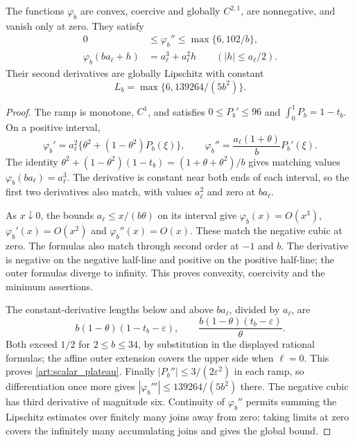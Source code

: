 \begin{lemma}\label{art:upper_scalar_lemma}
The functions $\varphi_b$ are convex, coercive and globally $C^{2,1}$,
are nonnegative, and vanish only at zero. They satisfy
\begin{align}
 0&\le\varphi_b''\le\max\{6,102/b\},\label{art:scalar_curvature}\\
 \varphi_b(ba_\ell+h)&=a_\ell^3+a_\ell^2h
       \qquad(|h|\le a_\ell/2).\label{art:scalar_plateau}
\end{align}
Their second derivatives are globally Lipschitz with constant
\[
 L_b=\max\{6,139264/(5b^2)\}.
\]
\end{lemma}
\begin{proof}
The ramp is monotone, $C^1$, and satisfies
$0\le P_b'\le96$ and $\int_0^1P_b=1-t_b$. On a positive interval,
\[
 \varphi_b'=a_\ell^2\{\theta^2+(1-\theta^2)P_b(\xi)\},\qquad
 \varphi_b''=\frac{a_\ell(1+\theta)}bP_b'(\xi).
\]
The identity
$\theta^2+(1-\theta^2)(1-t_b)=(1+\theta+\theta^2)/b$
gives matching values $\varphi_b(ba_\ell)=a_\ell^3$. The derivative is
constant near both ends of each interval, so the first two derivatives
also match, with values $a_\ell^2$ and zero at $ba_\ell$.

As $x\downarrow0$, the bounds $a_\ell\le x/(b\theta)$ on its interval
give $\varphi_b(x)=O(x^3)$, $\varphi_b'(x)=O(x^2)$ and
$\varphi_b''(x)=O(x)$. These match the negative cubic at zero.
The formulas also match through second order at $-1$ and $b$.
The derivative is negative on the negative half-line and positive on the
positive half-line; the outer formulas diverge to infinity. This proves
convexity, coercivity and the minimum assertions.

The constant-derivative lengths below and above $ba_\ell$, divided by $a_\ell$,
are
\[
 b(1-\theta)(1-t_b-\varepsilon),\qquad
 \frac{b(1-\theta)(t_b-\varepsilon)}\theta.
\]
Both exceed $1/2$ for $2\le b\le34$, by substitution in the displayed
rational formulas; the affine outer extension covers the upper side when
$\ell=0$. This proves \eqref{art:scalar_plateau}.
Finally $|P_b''|\le3/(2\varepsilon^2)$ in each ramp, so differentiation
once more gives $|\varphi_b'''|\le139264/(5b^2)$ there. The negative
cubic has third derivative of magnitude six. Continuity of
$\varphi_b''$ permits summing the Lipschitz estimates over finitely many
joins away from zero; taking limits at zero covers the infinitely many
accumulating joins and gives the global bound.
\end{proof}

